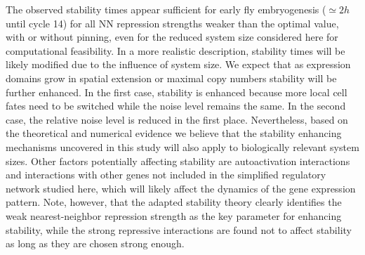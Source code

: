 \documentclass[a4paper,10pt]{article}
\begin{document}

The observed stability times appear sufficient for early fly embryogenesis  ($\simeq 2 h$ until cycle 14) for all NN repression strengths weaker than the optimal value, 
with or without pinning, even for the reduced system size considered here for computational feasibility.
In a more realistic description, stability times will be likely modified due to the influence of system size. We expect that as expression domains grow in spatial extension or maximal copy numbers stability will be further enhanced. In the first case, stability is enhanced because more local cell fates need to be switched while the noise level remains the same. In the second case, the relative noise level is reduced in the first place.
Nevertheless, based on the theoretical and numerical evidence we believe that the stability enhancing mechanisms uncovered in this study will also apply to biologically relevant system sizes. Other factors potentially affecting stability are autoactivation interactions and interactions with other genes not included in the simplified regulatory network studied here, which will likely affect the dynamics of the gene expression pattern. Note, however, that the adapted stability theory clearly identifies the weak nearest-neighbor repression strength as the key parameter for enhancing stability, while the strong repressive interactions are found not to affect stability as long as they are chosen strong enough.

\end{document}
